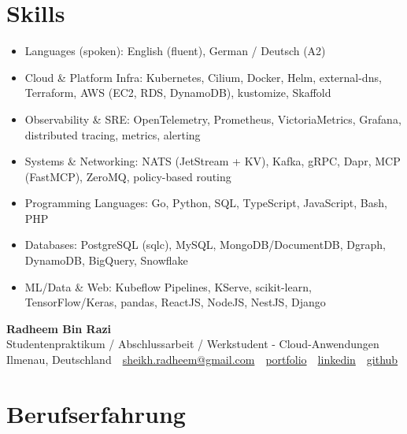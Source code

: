 \documentclass[10pt,a4paper]{resume}
\makeatletter
\newcommand{\Portfolio}{https://radheem.github.io/my-cv}
\newcommand{\PortfolioText}{portfolio}
\newcommand{\GitHub}{https://github.com/radheem}
\newcommand{\LinkedIn}{https://www.linkedin.com/in/radheem-razi}
\newcommand{\Email}{sheikh.radheem@gmail.com}
\makeatother
\begin{document}
\section{Skills}

\begin{itemize}[leftmargin=1.4em,nosep,topsep=2pt]
  \item Languages (spoken): English (fluent), German / Deutsch (A2)
  \item Cloud \& Platform Infra: Kubernetes, Cilium, Docker, Helm, external-dns, Terraform, AWS (EC2, RDS, DynamoDB), kustomize, Skaffold
  \item Observability \& SRE: OpenTelemetry, Prometheus, VictoriaMetrics, Grafana, distributed tracing, metrics, alerting
  \item Systems \& Networking: NATS (JetStream + KV), Kafka, gRPC, Dapr, MCP (FastMCP), ZeroMQ, policy-based routing
  \item Programming Languages: Go, Python, SQL, TypeScript, JavaScript, Bash, PHP
  \item Databases: PostgreSQL (sqlc), MySQL, MongoDB/DocumentDB, Dgraph, DynamoDB, BigQuery, Snowflake
  \item ML/Data \& Web: Kubeflow Pipelines, KServe, scikit-learn, TensorFlow/Keras, pandas, ReactJS, NodeJS, NestJS, Django
\end{itemize}

\clearpage
{}

\begin{center}
  {\huge\bfseries Radheem Bin Razi}\\[3pt]
  {\large Studentenpraktikum / Abschlussarbeit / Werkstudent - Cloud-Anwendungen}\\[6pt]
  \small
  Ilmenau, Deutschland \,\textbar\,
  \href{mailto:\Email}{\Email} \,\textbar\,
  \href{\Portfolio}{\PortfolioText} \,\textbar\,
  \href{\LinkedIn}{linkedin} \,\textbar\,
  \href{\GitHub}{github}
\end{center}
\vspace{2pt}

\section{Berufserfahrung}
\end{document}
